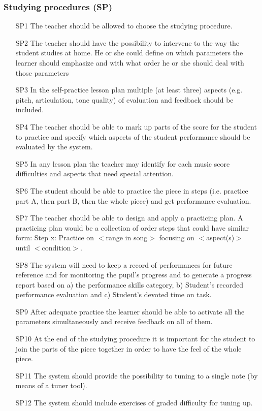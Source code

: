 \subsubsection{Studying procedures (SP)}
\begin{itemize}
\item[SP1] The teacher should be allowed to choose the studying procedure.
\item[SP2] The teacher should have the possibility to intervene to the way the student studies at home. He or she could define on which parameters the learner should emphasize and with what order he or she should deal with those parameters
\item[SP3] In the self-practice lesson plan multiple (at least three) aspects (e.g. pitch, articulation, tone quality) of evaluation and feedback should be included.
\item[SP4] The teacher should be able to mark up parts of the score for the student to practice and specify which aspects of the student performance should be evaluated by the system.
\item[SP5] In any lesson plan the teacher may identify for each music score difficulties and aspects that need special attention.
\item[SP6] The student should be able to practice the piece in steps (i.e. practice part A, then part B, then the whole piece) and get performance evaluation.
\item[SP7] The teacher should be able to design and apply a practicing plan. A practicing plan would be a collection of order steps that could have similar form: Step x: Practice on $<$range in song$>$ focusing on $<$aspect(s)$>$ until $<$condition$>$.
\item[SP8] The system will need to keep a record of performances for future reference and for monitoring the pupil's progress and to generate a progress report based on a) the performance skills category, b) Student’s recorded performance evaluation and c) Student’s devoted time on task.
\item[SP9] After adequate practice the learner should be able to activate all the parameters simultaneously and receive feedback on all of them.
\item[SP10] At the end of the studying procedure it is important for the student to join the parts of the piece together in order to have the feel of the whole piece.
\item[SP11] The system should provide the possibility to tuning to a single note (by means of a tuner tool).
\item[SP12] The system should include exercises of graded difficulty for tuning up.
\end{itemize}


